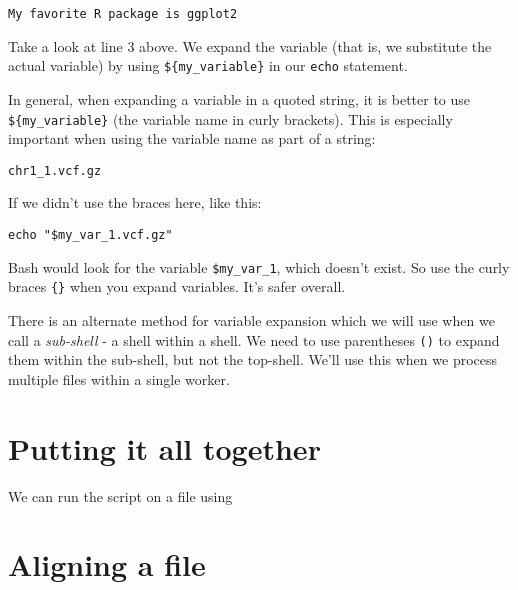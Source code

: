 \documentclass[
  letterpaper,
  DIV=11,
  numbers=noendperiod]{scrreprt}
\newenvironment{Shaded}{\begin{snugshade}}{\end{snugshade}}
\newcommand{\BuiltInTok}[1]{\textcolor[rgb]{0.00,0.23,0.31}{#1}}
\newcommand{\OperatorTok}[1]{\textcolor[rgb]{0.37,0.37,0.37}{#1}}
\newcommand{\StringTok}[1]{\textcolor[rgb]{0.13,0.47,0.30}{#1}}
\newcommand{\VariableTok}[1]{\textcolor[rgb]{0.07,0.07,0.07}{#1}}
\begin{document}
\begin{verbatim}
My favorite R package is ggplot2
\end{verbatim}

Take a look at line 3 above. We expand the variable (that is, we
substitute the actual variable) by using \texttt{\$\{my\_variable\}} in
our \texttt{echo} statement.

In general, when expanding a variable in a quoted string, it is better
to use \texttt{\$\{my\_variable\}} (the variable name in curly
brackets). This is especially important when using the variable name as
part of a string:

\begin{Shaded}
\end{Shaded}

\begin{verbatim}
chr1_1.vcf.gz
\end{verbatim}

If we didn't use the braces here, like this:

\begin{verbatim}
echo "$my_var_1.vcf.gz"
\end{verbatim}

Bash would look for the variable \texttt{\$my\_var\_1}, which doesn't
exist. So use the curly braces \texttt{\{\}} when you expand variables.
It's safer overall.

There is an alternate method for variable expansion which we will use
when we call a \emph{sub-shell} - a shell within a shell. We need to use
parentheses \texttt{()} to expand them within the sub-shell, but not the
top-shell. We'll use this when we process multiple files within a single
worker.

\section{Putting it all together}\label{putting-it-all-together}

We can run the script on a file using

\section{Aligning a file}\label{aligning-a-file}
\end{document}
